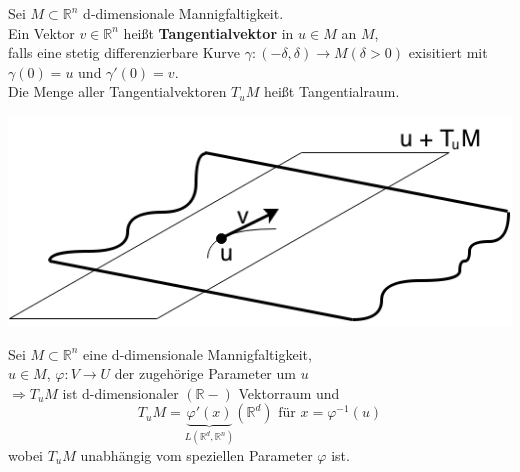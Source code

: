 \begin{definition}
Sei $M \subset \mathbb{R}^n $ d-dimensionale Mannigfaltigkeit. \\
Ein Vektor $v \in \mathbb{R}^n $ heißt \textbf{Tangentialvektor} in $u \in M $ an $M$, \\
falls eine stetig differenzierbare Kurve 
$\gamma: (-\delta, \delta) \rightarrow M (\delta > 0) $ exisitiert mit \\
$\gamma (0) = u $ und $\gamma' (0) = v $. \\
Die Menge aller Tangentialvektoren $T_uM$ heißt Tangentialraum.\\
\begin{center}
\includegraphics[scale=0.5]{pictures/002-04}\\
\end{center}
\end{definition}

\begin{satz}
Sei $M \subset \mathbb{R}^n $ eine d-dimensionale Mannigfaltigkeit, \\
$u \in M $, $ \varphi : V \rightarrow U $ der zugehörige Parameter um $u$ \\
$\Longrightarrow T_uM $ ist d-dimensionaler $( \mathbb{R}-) $ Vektorraum und \\
    \begin{equation}
    T_uM = \underbrace{\varphi'(x)}_{L \left( \mathbb{R}^d, \mathbb{R}^n \right) }
    \left( \mathbb{R}^d \right) \text{ für } x = \varphi^{-1} (u) 
    \end{equation}
wobei $T_uM$ unabhängig vom speziellen Parameter $\varphi$ ist.
\end{satz}

